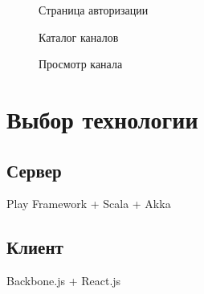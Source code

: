 \documentclass[a4paper]{report}
\begin{document}
\begin{figure}[h!]
  \centering
  \caption{Страница авторизации}
  \label{third}
\end{figure}

\begin{figure}[h!]
  \centering
  \caption{Каталог каналов}
  \label{third}
\end{figure}

\begin{figure}[h!]
  \centering
  \caption{Просмотр канала}
  \label{third}
\end{figure}

\section{Выбор технологии}
\subsection{Сервер}
Play Framework + Scala + Akka
\subsection{Клиент}
Backbone.js + React.js
\end{document}
